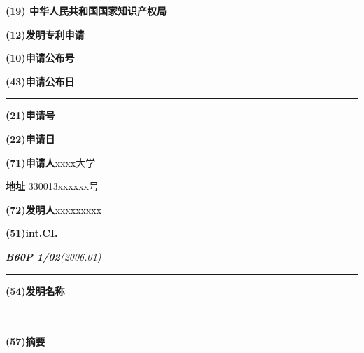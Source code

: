 \thispagestyle{empty}

\begin{flushleft}
    \textbf{{\Large(19) 中华人民共和国国家知识产权局}}
\end{flushleft}
\begin{center}
    \textbf{{\LARGE (12)发明专利申请}}
\end{center}

\begin{flushright}
    \textbf{(10)申请公布号}

    \textbf{(43)申请公布日}
    \rule[18pt]{17.3cm}{0.1em}
\end{flushright}
\begin{flushleft}
    \textbf{(21)申请号 }

    \textbf{(22)申请日}

    \textbf{(71)申请人}\quad  xxxx大学

    \hspace{2.5em}\textbf{地址} \quad\hspace{0.5em}330013\quad xxxxxx号


    \textbf{(72)发明人}\quad xxx\quad xxx\quad xxx

    \textbf{(51)int.CI.}

    \quad\quad\textit{\textbf{B60P 1/02}(2006.01)}
\end{flushleft}
\begin{flushright}
    \rule[16pt]{17.3cm}{0.1em}
\end{flushright}



\begin{multicols}{2}
    \begin{flushleft}
        \textbf{(54)发明名称}
    \end{flushleft}
    {\large  \name}\\
    \\
    \textbf{(57)摘要}

    \coverabstract
\end{multicols}
